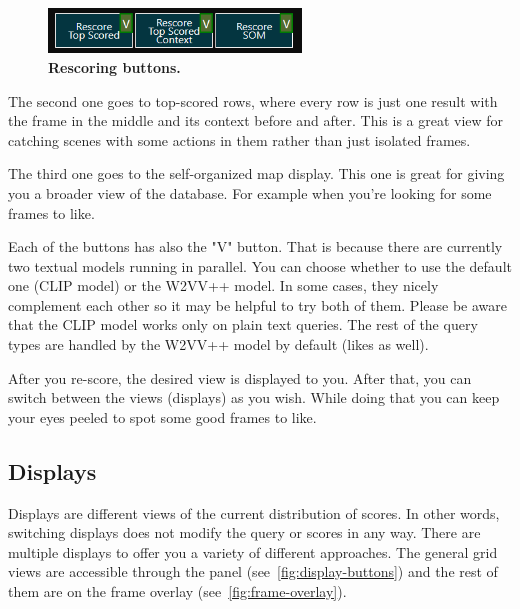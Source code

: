 \begin{figure}[h]
	\centering
	\includegraphics[width=0.6\textwidth]{img/rescore-buttons.png}
  \caption{\textbf{Rescoring buttons.}}
	\label{fig:rescore}
\end{figure}

The second one goes to top-scored rows, where every row is just one result with the frame in the middle and its context before and after. This is a great view for catching scenes with some actions in them rather than just isolated frames.

The third one goes to the self-organized map display. This one is great for giving you a broader view of the database. For example when you're looking for some frames to like.

Each of the buttons has also the "V" button. That is because there are currently two textual models running in parallel. You can choose whether to use the default one (CLIP model) or the W2VV++ model. In some cases, they nicely complement each other so it may be helpful to try both of them. Please be aware that the CLIP model works only on plain text queries. The rest of the query types are handled by the W2VV++ model by default (likes as well).

After you re-score, the desired view is displayed to you. After that, you can switch between the views (displays) as you wish. While doing that you can keep your eyes peeled to spot some good frames to like.

\pagebreak
\subsection{Displays}

Displays are different views of the current distribution of scores. In other words, switching displays does not modify the query or scores in any way. 
There are multiple displays to offer you a variety of different approaches.
The general grid views are accessible through the panel (see~\cref{fig:display-buttons}) and the rest of them are on the frame overlay (see~\cref{fig:frame-overlay}).

